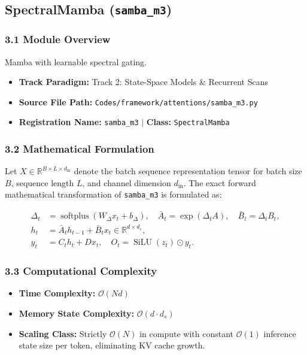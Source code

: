 \subsection{SpectralMamba (\texttt{samba\_m3})}
\label{sec:app_module_samba_m3}

\subsubsection*{3.1 Module Overview}
Mamba with learnable spectral gating.
\begin{itemize}
    \item \textbf{Track Paradigm:} Track 2: State-Space Models & Recurrent Scans
    \item \textbf{Source File Path:} \texttt{Codes/framework/attentions/samba\_m3.py}
    \item \textbf{Registration Name:} \texttt{samba\_m3} $\mid$ \textbf{Class:} \texttt{SpectralMamba}
\end{itemize}

\subsubsection*{3.2 Mathematical Formulation}
Let $X \in \mathbb{R}^{B \times L \times d_{\text{in}}}$ denote the batch sequence representation tensor for batch size $B$, sequence length $L$, and channel dimension $d_{\text{in}}$. The exact forward mathematical transformation of \texttt{samba\_m3} is formulated as:

\begin{align}
\Delta_t &= \operatorname{softplus}(W_\Delta x_t + b_\Delta), \quad \bar{A}_t = \exp(\Delta_t A), \quad \bar{B}_t = \Delta_t B_t, \\
h_t &= \bar{A}_t h_{t-1} + \bar{B}_t x_t \in \mathbb{R}^{d \times d_s}, \\
y_t &= C_t h_t + D x_t, \quad O_t = \operatorname{SiLU}(z_t) \odot y_t.
\end{align}


\subsubsection*{3.3 Computational Complexity}
\begin{itemize}
    \item \textbf{Time Complexity:} $\mathcal{O}(N d)$
    \item \textbf{Memory State Complexity:} $\mathcal{O}(d \cdot d_s)$
    \item \textbf{Scaling Class:} Strictly $\mathcal{O}(N)$ in compute with constant $\mathcal{O}(1)$ inference state size per token, eliminating KV cache growth.
\end{itemize}

